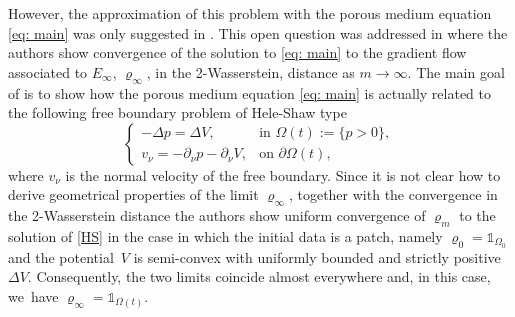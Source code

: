 However, the approximation of this problem with the porous medium equation \eqref{eq: main} was only suggested in \cite{MRSV2011, MRS2010}. This open question was addressed in \cite{AKY14} where the authors show convergence of the solution to \eqref{eq: main} to the gradient flow associated to $E_\infty$, $\varrho_\infty$, in the 2-Wasserstein, distance as $m\to\infty$. The main goal of \cite{AKY14} is to show how the porous medium equation \eqref{eq: main} is actually related to the following free boundary problem of Hele-Shaw type
\begin{equation}\label{HS}
\begin{cases}
-\Delta p = \Delta V, &\text{in } \Omega(t):=\{p>0\},\\
v_\nu= -\partial_\nu p -\partial_\nu V, &\text{on } \partial\Omega(t),
\end{cases}
\end{equation}
where $v_\nu$ is the normal velocity of the free boundary. Since it is not clear how to derive geometrical properties of the limit $\varrho_\infty$, together with the convergence in the 2-Wasserstein distance the authors show uniform convergence of $\varrho_m$ to the solution of \eqref{HS} in the case in which the initial data is a patch, namely $\varrho_0=\mathds{1}_{\Omega_0}$ and the potential~$V$ is semi-convex with uniformly bounded and strictly positive $\Delta V$. Consequently, the two limits coincide almost everywhere and, in this case, we~have $\varrho_\infty=\mathds{1}_{\Omega(t)}$.

